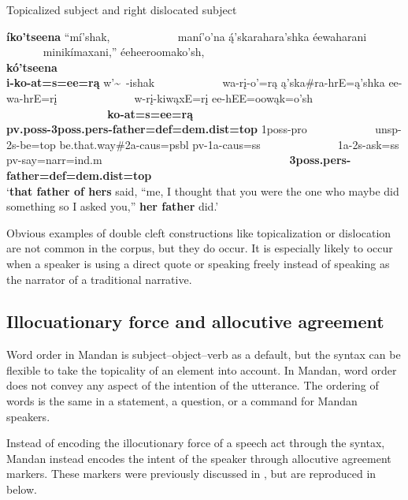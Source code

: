 \begin{exe}
    \item\label{Ch5ExDoubleTopics} Topicalized subject and right dislocated subject
    
    \glll \textbf{íko'tseena} ``mí'shak, ~ ~ ~ ~ ~ ~ ~ maní'o'na ą́'skarahara'shka éewaharani  ~ ~ ~ ~  ~ ~ ~ ~ minikímaxani,'' éeheeroomako'sh, ~ ~ ~ ~ ~ ~ ~ ~ ~ ~ ~ ~ ~ ~ ~ ~ ~ ~ ~ ~ \textbf{kó'tseena}\\
    \textbf{i-ko-at=s=ee=rą} w'\~~-ishak ~ ~ ~ ~ ~ ~ ~ wa-rį-o'=rą ą'ska\#ra-hrE=ą'shka ee-wa-hrE=rį  ~ ~ ~ ~ ~ ~  ~ ~  w-rį-kiwąxE=rį ee-hEE=oowąk=o'sh ~ ~ ~ ~ ~ ~ ~ ~ ~ ~ ~ ~ ~ ~ ~ ~ ~ ~ ~ ~ \textbf{ko-at=s=ee=rą}\\
    \textbf{pv.poss-3poss.pers-\textnormal{\bfseries father}=def=dem.dist=top} 1poss-\textnormal{pro} ~ ~ ~ ~ ~ ~ ~ unsp-2s-\textnormal{be}=top \textnormal{be.that.way}\#2a-caus=psbl pv-1a-caus=ss  ~ ~ ~ ~ ~ ~  ~ ~  1a-2s-\textnormal{ask}=ss pv-\textnormal{say}=narr=ind.m ~ ~ ~ ~ ~ ~ ~ ~ ~ ~ ~ ~ ~ ~ ~ ~ ~ ~ ~ ~ \textbf{3poss.pers-\textnormal{\bfseries father}=def=dem.dist=top}
\\
    \glt `\textbf{that father of hers} said, ``me, I thought that you were the one who maybe did something so I asked you,'' \textbf{her father} did.' \citep[238]{hollow1973b}
\end{exe}

Obvious examples of double cleft constructions like topicalization or dislocation are not common in the corpus, but they do occur. It is especially likely to occur when a speaker is using a direct quote or speaking freely instead of speaking as the narrator of a traditional narrative.

\subsection{Illocuationary force and allocutive agreement}\label{Ch5IllocutionaryForce}

Word order in Mandan is subject--object--verb as a default, but the syntax can be flexible to take the topicality of an element into account. In Mandan, word order does not convey any aspect of the intention of the utterance. The ordering of words is the same in a statement, a question, or a command for Mandan speakers.

Instead of encoding the illocutionary force of a speech act through the syntax, Mandan instead encodes the intent of the speaker through allocutive agreement markers. These markers were previously discussed in , but are reproduced in  below.

